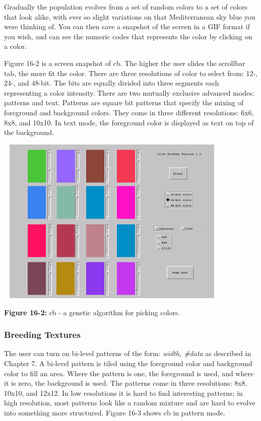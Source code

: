 Gradually the population evolves from a set of random colors to a set of
colors that look alike, with ever so slight variations on that
Mediterranean sky blue you were thinking of. You can then save a
snapshot of the screen in a GIF format if you wish, and can see the
numeric codes that represents the color by clicking on a color.

Figure 16-2 is a screen snapshot of \textsf{cb}. The higher the user
slides the scrollbar tab, the more fit the color. There are three
resolutions of color to select from: 12-, 24-, and 48-bit.
The bits are equally divided into three segments each representing a
color intensity. There are two mutually exclusive advanced modes:
patterns and text. Patterns are square bit patterns that specify the
mixing of foreground and background colors. They come in three
different resolutions: 6x6, 8x8, and 10x10. In text mode, the
foreground color is displayed as text on top of the background.

\begin{center}
\includegraphics[width=4.4571in,height=3.1807in]{ub-img/ub-img46.png}
\end{center}

{\sffamily\bfseries Figure 16-2:}
{\sffamily cb - a genetic algorithm for picking colors.}

\subsubsection{Breeding Textures}
The user can turn on bi-level patterns of the form: \textit{width,
\#data} as described in Chapter 7. A bi-level pattern is tiled using
the foreground color and background color to fill an area. Where the
pattern is one, the foreground is used, and where it is zero, the
background is used. The patterns come in three resolutions: 8x8, 10x10,
and 12x12. In low resolutions it is hard to find interesting patterns;
in high resolution, most patterns look like a random mixture and are
hard to evolve into something more structured. Figure 16-3 shows
\textsf{cb} in pattern mode.

